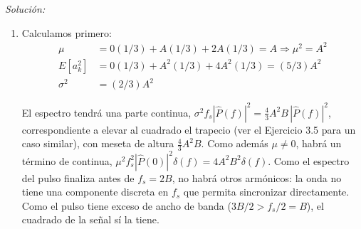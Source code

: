 \documentclass[a4paper,11pt]{article}
\newenvironment{solucion}[1][]{
\noindent \large \textsl{Solución:} \ifthenelse{\equal{#1}{}}{}{\emph{(#1)}}

\smallskip
}{
\bigskip
}
\begin{document}
\begin{solucion}
\begin{enumerate}
        \begin{center}
        \end{center}

        \item Calculamos primero:
         \begin{align*}
                \mu &= 0 (1/3) + A (1/3) + 2A (1/3) = A \Rightarrow \mu^2 = A^2\\
                E[a_k^2] &= 0 (1/3) + A^2 (1/3) + 4A^2 (1/3) = (5/3)A^2 \\
                \sigma^2 &= (2/3)A^2
         \end{align*}

         El espectro tendrá una parte continua, $\sigma^2 f_s|\hat P(f)|^2=\frac{4}{3}A^2B\,|\hat P(f)|^2$, correspondiente a elevar al cuadrado el trapecio (ver el Ejercicio 3.5 para un caso similar), con meseta de altura $\frac43A^2B$. Como además $\mu\neq 0$, habrá un término de continua, $\mu^2f_s^2|\hat P(0)|^2\delta(f)=4A^2B^2\delta(f)$. Como el espectro del pulso finaliza antes de $f_s = 2B$, no habrá otros armónicos: la onda no tiene una componente discreta en $f_s$ que permita sincronizar directamente. Como el pulso tiene exceso de ancho de banda ($3B/2>f_s/2=B$), el cuadrado de la señal sí la tiene.


\end{enumerate}
\end{solucion}
\end{document}
